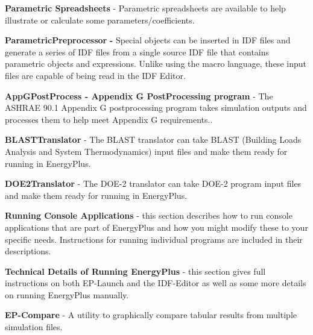 \textbf{Parametric Spreadsheets} - Parametric spreadsheets are available to help illustrate or calculate some parameters/coefficients.

\textbf{ParametricPreprocessor} \textbf{-} Special objects can be inserted in IDF files and generate a series of IDF files from a single source IDF file that contains parametric objects and expressions. Unlike using the macro language, these input files are capable of being read in the IDF Editor.

\textbf{AppGPostProcess - Appendix G PostProcessing program} - The ASHRAE 90.1 Appendix G postprocessing program takes simulation outputs and processes them to help meet Appendix G requirements..

\textbf{BLASTTranslator} - The BLAST translator can take BLAST (Building Loads Analysis and System Thermodynamics) input files and make them ready for running in EnergyPlus.

\textbf{DOE2Translator} - The DOE-2 translator can take DOE-2 program input files and make them ready for running in EnergyPlus.

\textbf{Running Console Applications} - this section describes how to run console applications that are part of EnergyPlus and how you might modify these to your specific needs. Instructions for running individual programs are included in their descriptions.

\textbf{Technical Details of Running EnergyPlus} - this section gives full instructions on both EP-Launch and the IDF-Editor as well as some more details on running EnergyPlus manually.

\textbf{EP-Compare} - A utility to graphically compare tabular results from multiple simulation files.
